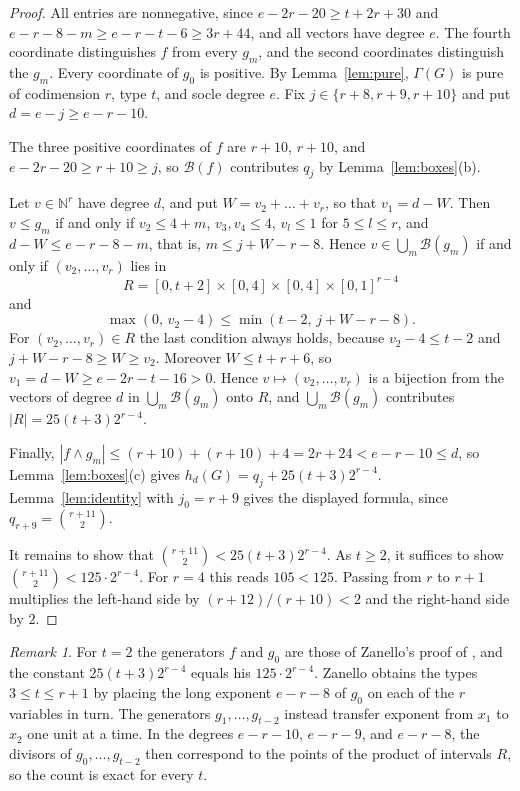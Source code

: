 \documentclass{amsart}
\theoremstyle{definition}
\theoremstyle{remark}
\newtheorem{remark}[theorem]{Remark}
\newcommand{\N}{\mathbb{N}}
\newcommand{\B}{\mathcal{B}}
\begin{document}
\begin{proof}
All entries are nonnegative, since $e-2r-20\ge t+2r+30$ and $e-r-8-m\ge e-r-t-6\ge 3r+44$, and all vectors have degree $e$. The fourth coordinate distinguishes $f$ from every $g_m$, and the second coordinates distinguish the $g_m$. Every coordinate of $g_0$ is positive. By Lemma~\ref{lem:pure}, $\Gamma(G)$ is pure of codimension $r$, type $t$, and socle degree $e$. Fix $j\in\{r+8,r+9,r+10\}$ and put $d=e-j\ge e-r-10$.

The three positive coordinates of $f$ are $r+10$, $r+10$, and $e-2r-20\ge r+10\ge j$, so $\B(f)$ contributes $q_j$ by Lemma~\ref{lem:boxes}(b).

Let $v\in\N^r$ have degree $d$, and put $W=v_2+\dots+v_r$, so that $v_1=d-W$. Then $v\le g_m$ if and only if $v_2\le 4+m$, $v_3,v_4\le 4$, $v_l\le 1$ for $5\le l\le r$, and $d-W\le e-r-8-m$, that is, $m\le j+W-r-8$. Hence $v\in\bigcup_m\B(g_m)$ if and only if $(v_2,\dots,v_r)$ lies in
\[
R=[0,t+2]\times[0,4]\times[0,4]\times[0,1]^{r-4}
\]
and
\[
\max(0,\,v_2-4)\le\min(t-2,\,j+W-r-8).
\]
For $(v_2,\dots,v_r)\in R$ the last condition always holds, because $v_2-4\le t-2$ and $j+W-r-8\ge W\ge v_2$. Moreover $W\le t+r+6$, so $v_1=d-W\ge e-2r-t-16>0$. Hence $v\mapsto(v_2,\dots,v_r)$ is a bijection from the vectors of degree $d$ in $\bigcup_m\B(g_m)$ onto $R$, and $\bigcup_m\B(g_m)$ contributes $|R|=25(t+3)2^{r-4}$.

Finally, $|f\wedge g_m|\le (r+10)+(r+10)+4=2r+24<e-r-10\le d$, so Lemma~\ref{lem:boxes}(c) gives $h_d(G)=q_j+25(t+3)2^{r-4}$. Lemma~\ref{lem:identity} with $j_0=r+9$ gives the displayed formula, since $q_{r+9}=\binom{r+11}{2}$.

It remains to show that $\binom{r+11}{2}<25(t+3)2^{r-4}$. As $t\ge 2$, it suffices to show $\binom{r+11}{2}<125\cdot 2^{r-4}$. For $r=4$ this reads $105<125$. Passing from $r$ to $r+1$ multiplies the left-hand side by $(r+12)/(r+10)<2$ and the right-hand side by $2$.
\end{proof}

\begin{remark}\label{rem:zanello}
For $t=2$ the generators $f$ and $g_0$ are those of Zanello's proof of \cite[Theorem~8(2)]{Za}, and the constant $25(t+3)2^{r-4}$ equals his $125\cdot 2^{r-4}$. Zanello obtains the types $3\le t\le r+1$ by placing the long exponent $e-r-8$ of $g_0$ on each of the $r$ variables in turn. The generators $g_1,\dots,g_{t-2}$ instead transfer exponent from $x_1$ to $x_2$ one unit at a time. In the degrees $e-r-10$, $e-r-9$, and $e-r-8$, the divisors of $g_0,\dots,g_{t-2}$ then correspond to the points of the product of intervals $R$, so the count is exact for every $t$.
\end{remark}
\end{document}
